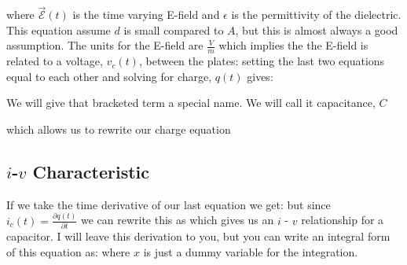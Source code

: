 \documentclass{handout}
\begin{document}
where $\vec{\mathcal{E}}(t)$ is the time varying E-field and $\epsilon$ is the permittivity of the dielectric.  This equation assume $d$ is small compared to $A$, but this is almost always a good assumption.  The units for the E-field are $\frac{V}{m}$ which implies the the E-field is related to a voltage, $v_c(t)$, between the plates:
setting the last two equations equal to each other and solving for charge, $q(t)$ gives:

We will give that bracketed term a special name.  We will call it capacitance, $C$


which allows us to rewrite our charge equation


\subsection{$i$-$v$ Characteristic}
If we take the time derivative of our last equation we get:
but since $i_c(t) = \frac{\partial q(t)}{\partial t}$ we can rewrite this as
which gives us an $i$ - $v$ relationship for a capacitor.  I will leave this derivation to you, but you can write an integral form of this equation as:
where $x$ is just a dummy variable for the integration.
\end{document}
